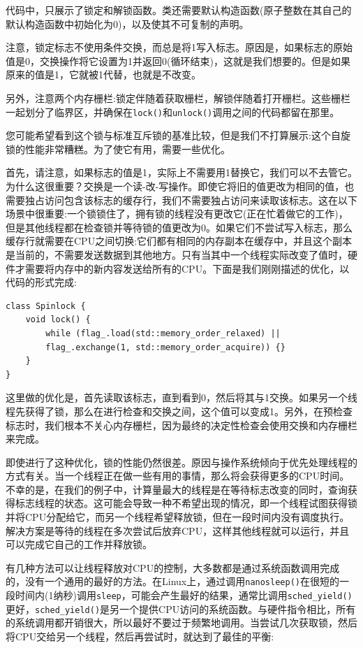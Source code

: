 代码中，只展示了锁定和解锁函数。类还需要默认构造函数(原子整数在其自己的默认构造函数中初始化为0)，以及使其不可复制的声明。

注意，锁定标志不使用条件交换，而总是将1写入标志。原因是，如果标志的原始值是0，交换操作将它设置为1并返回0(循环结束)，这就是我们想要的。但是如果原来的值是1，它就被1代替，也就是不改变。

另外，注意两个内存栅栏:锁定伴随着获取栅栏，解锁伴随着打开栅栏。这些栅栏一起划分了临界区，并确保在\texttt{lock()}和\texttt{unlock()}调用之间的代码都留在那里。

您可能希望看到这个锁与标准互斥锁的基准比较，但是我们不打算展示:这个自旋锁的性能非常糟糕。为了使它有用，需要一些优化。

首先，请注意，如果标志的值是1，实际上不需要用1替换它，我们可以不去管它。为什么这很重要？交换是一个读-改-写操作。即使它将旧的值更改为相同的值，也需要独占访问包含该标志的缓存行，我们不需要独占访问来读取该标志。这在以下场景中很重要:一个锁锁住了，拥有锁的线程没有更改它(正在忙着做它的工作)，但是其他线程都在检查锁并等待锁的值更改为0。如果它们不尝试写入标志，那么缓存行就需要在CPU之间切换:它们都有相同的内存副本在缓存中，并且这个副本是当前的，不需要发送数据到其他地方。只有当其中一个线程实际改变了值时，硬件才需要将内存中的新内容发送给所有的CPU。下面是我们刚刚描述的优化，以代码的形式完成:

\begin{lstlisting}[style=styleCXX]
class Spinlock {
	void lock() {
		while (flag_.load(std::memory_order_relaxed) ||
		flag_.exchange(1, std::memory_order_acquire)) {}
	}
}
\end{lstlisting}

这里做的优化是，首先读取该标志，直到看到0，然后将其与1交换。如果另一个线程先获得了锁，那么在进行检查和交换之间，这个值可以变成1。另外，在预检查标志时，我们根本不关心内存栅栏，因为最终的决定性检查会使用交换和内存栅栏来完成。

即使进行了这种优化，锁的性能仍然很差。原因与操作系统倾向于优先处理线程的方式有关。当一个线程正在做一些有用的事情，那么将会获得更多的CPU时间。不幸的是，在我们的例子中，计算量最大的线程是在等待标志改变的同时，查询获得标志线程的状态。这可能会导致一种不希望出现的情况，即一个线程试图获得锁并将CPU分配给它，而另一个线程希望释放锁，但在一段时间内没有调度执行。解决方案是等待的线程在多次尝试后放弃CPU，这样其他线程就可以运行，并且可以完成它自己的工作并释放锁。

有几种方法可以让线程释放对CPU的控制，大多数都是通过系统函数调用完成的，没有一个通用的最好的方法。在Linux上，通过调用\texttt{nanosleep()}在很短的一段时间内(1纳秒)调用\texttt{sleep}，可能会产生最好的结果，通常比调用\texttt{sched\_yield()}更好，\texttt{sched\_yield()}是另一个提供CPU访问的系统函数。与硬件指令相比，所有的系统调用都开销很大，所以最好不要过于频繁地调用。当尝试几次获取锁，然后将CPU交给另一个线程，然后再尝试时，就达到了最佳的平衡:

